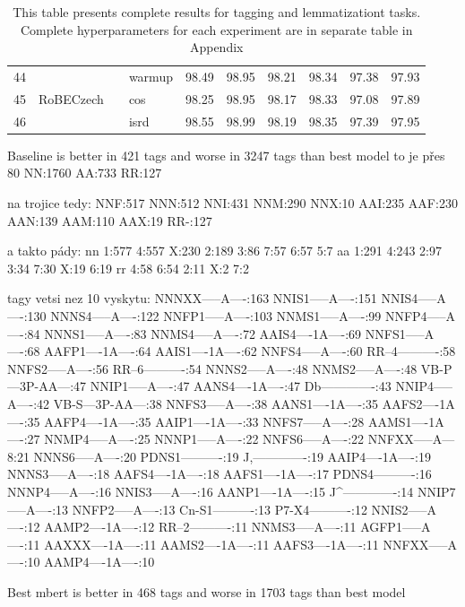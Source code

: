 \begin{table}[!h]
{\begin{tabular}{|l|l|l|l||llllll|}
44 & \multirow{3}{*}{RoBECzech}   &                         & warmup & 98.49  & 98.95   & 98.21   & 98.34    & 97.38     & 97.93      \\ \cline{1-1} \cline{4-10}
45 &                              &                         & cos    & 98.25  & 98.95   & 98.17   & 98.33    & 97.08     & 97.89      \\ \cline{1-1} \cline{4-10}
46 &                              &                         & isrd   & 98.55  & 98.99   & 98.19   & 98.35    & 97.39     & 97.95      \\ \hline
\end{tabular}
}
\caption{This table presents complete results for tagging and lemmatizationt tasks.  Complete hyperparameters for each experiment are in separate table in Appendix %
}
\label{tab:all_res_tl}
\end{table}

Baseline is better in 421 tags and worse in 3247 tags than best model 
to je přes 80%
NN:1760
AA:733
RR:127

na trojice tedy: 
NNF:517
NNN:512
NNI:431
NNM:290
NNX:10
AAI:235
AAF:230
AAN:139
AAM:110
AAX:19
RR-:127

a takto pády:
nn
1:577
4:557
X:230
2:189
3:86
7:57
6:57
5:7
aa
1:291
4:243
2:97
3:34
7:30
X:19
6:19
rr
4:58
6:54
2:11
X:2
7:2

tagy vetsi nez 10 vyskytu:
NNNXX-----A----:163
NNIS1-----A----:151
NNIS4-----A----:130
NNNS4-----A----:122
NNFP1-----A----:103
NNMS1-----A----:99
NNFP4-----A----:84
NNNS1-----A----:83
NNMS4-----A----:72
AAIS4----1A----:69
NNFS1-----A----:68
AAFP1----1A----:64
AAIS1----1A----:62
NNFS4-----A----:60
RR--4----------:58
NNFS2-----A----:56
RR--6----------:54
NNNS2-----A----:48
NNMS2-----A----:48
VB-P---3P-AA---:47
NNIP1-----A----:47
AANS4----1A----:47
Db-------------:43
NNIP4-----A----:42
VB-S---3P-AA---:38
NNFS3-----A----:38
AANS1----1A----:35
AAFS2----1A----:35
AAFP4----1A----:35
AAIP1----1A----:33
NNFS7-----A----:28
AAMS1----1A----:27
NNMP4-----A----:25
NNNP1-----A----:22
NNFS6-----A----:22
NNFXX-----A---8:21
NNNS6-----A----:20
PDNS1----------:19
J,-------------:19
AAIP4----1A----:19
NNNS3-----A----:18
AAFS4----1A----:18
AAFS1----1A----:17
PDNS4----------:16
NNNP4-----A----:16
NNIS3-----A----:16
AANP1----1A----:15
J^-------------:14
NNIP7-----A----:13
NNFP2-----A----:13
Cn-S1----------:13
P7-X4----------:12
NNIS2-----A----:12
AAMP2----1A----:12
RR--2----------:11
NNMS3-----A----:11
AGFP1-----A----:11
AAXXX----1A----:11
AAMS2----1A----:11
AAFS3----1A----:11
NNFXX-----A----:10
AAMP4----1A----:10



Best mbert is better in 468 tags and worse in 1703 tags than best model 
